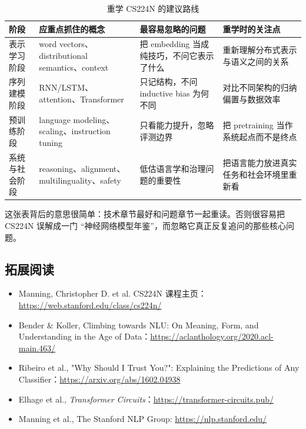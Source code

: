 \begin{table}[H]
\centering
\begin{tabular}{p{} p{} p{} p{}}
\toprule
阶段 & 应重点抓住的概念 & 最容易忽略的问题 & 重学时的关注点 \\
\midrule
表示学习阶段 & word vectors、distributional semantics、context & 把 embedding 当成纯技巧，不问它表示了什么 & 重新理解分布式表示与语义之间的关系 \\
序列建模阶段 & RNN/LSTM、attention、Transformer & 只记结构，不问 inductive bias 为何不同 & 对比不同架构的归纳偏置与数据效率 \\
预训练阶段 & language modeling、scaling、instruction tuning & 只看能力提升，忽略评测边界 & 把 pretraining 当作系统起点而不是终点 \\
系统与社会阶段 & reasoning、alignment、multilinguality、safety & 低估语言学和治理问题的重要性 & 把语言能力放进真实任务和社会环境里重新看 \\
\bottomrule
\end{tabular}
\caption{重学 CS224N 的建议路线}
\end{table}

这张表背后的意思很简单：技术章节最好和问题章节一起重读。否则很容易把 CS224N 误解成一门 ``神经网络模型年鉴''，而忽略它真正反复追问的那些核心问题。

\subsection{拓展阅读}

\begin{itemize}
    \item Manning, Christopher D. et al. CS224N 课程主页：\url{https://web.stanford.edu/class/cs224n/}
    \item Bender \& Koller, Climbing towards NLU: On Meaning, Form, and Understanding in the Age of Data：\url{https://aclanthology.org/2020.acl-main.463/}
    \item Ribeiro et al., "Why Should I Trust You?": Explaining the Predictions of Any Classifier：\url{https://arxiv.org/abs/1602.04938}
    \item Elhage et al., \emph{Transformer Circuits}：\url{https://transformer-circuits.pub/}
    \item Manning et al., The Stanford NLP Group: \url{https://nlp.stanford.edu/}
\end{itemize}



